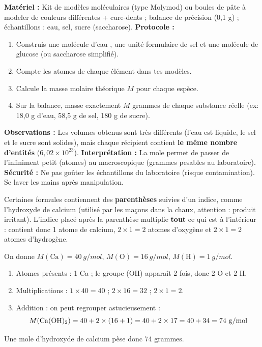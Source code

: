 \documentclass[11pt]{article}
\newcounter{popsec}
\newcounter{popsub}
\newcommand{\courssub}[1]{%
  \stepcounter{popsub}%
  \par\vspace{9pt}\noindent{\popxbold\fontsize{11.5}{13}\selectfont\color{popink}{\color{poporange}\thepopsec.\thepopsub}\hspace{6pt}#1}\par\nopagebreak\vspace{4pt}
}
\begin{document}
\begin{experience}
\textbf{Matériel :} Kit de modèles moléculaires (type Molymod) ou boules de pâte à modeler de couleurs différentes + cure-dents ; balance de précision (0,1 g) ; échantillons : eau, sel, sucre (saccharose).
\textbf{Protocole :}
\begin{enumerate}
\item Construis une molécule d'eau , une unité formulaire de sel  et une molécule de glucose  (ou saccharose  simplifié).
\item Compte les atomes de chaque élément dans tes modèles.
\item Calcule la masse molaire théorique $M$ pour chaque espèce.
\item Sur la balance, masse exactement $M$ grammes de chaque substance réelle (ex: 18,0 g d'eau, 58,5 g de sel, 180 g de sucre).
\end{enumerate}
\textbf{Observations :} Les volumes obtenus sont très différents (l'eau est liquide, le sel et le sucre sont solides), mais chaque récipient contient \textbf{le même nombre d'entités} ($6,02 \times 10^{23}$).
\textbf{Interprétation :} La mole permet de passer de l'infiniment petit (atomes) au macroscopique (grammes pesables au laboratoire).
\textbf{Sécurité :} Ne pas goûter les échantillons du laboratoire (risque contamination). Se laver les mains après manipulation.
\end{experience}

\courssub{Le piège des parenthèses}

Certaines formules contiennent des \textbf{parenthèses} suivies d'un indice, comme l'hydroxyde de calcium  (utilisé par les maçons dans la chaux, attention : produit irritant). L'indice placé après la parenthèse multiplie \textbf{tout} ce qui est à l'intérieur :  contient donc 1 atome de calcium, $2 \times 1 = 2$ atomes d'oxygène et $2 \times 1 = 2$ atomes d'hydrogène.

\begin{exemplebox}
On donne $M(\mathrm{Ca}) = 40~\si{g/mol}$, $M(\mathrm{O}) = 16~\si{g/mol}$, $M(\mathrm{H}) = 1~\si{g/mol}$.
\begin{enumerate}
\item Atomes présents : 1 Ca ; le groupe (OH) apparaît 2 fois, donc 2 O et 2 H.
\item Multiplications : $1 \times 40 = 40$ ; $2 \times 16 = 32$ ; $2 \times 1 = 2$.
\item Addition : on peut regrouper astucieusement :
\[ M(\ce{Ca(OH)2}) = 40 + 2 \times (16 + 1) = 40 + 2 \times 17 = 40 + 34 = 74~\si{g/mol} \]
\end{enumerate}
Une mole d'hydroxyde de calcium pèse donc 74 grammes.
\end{exemplebox}
\end{document}
